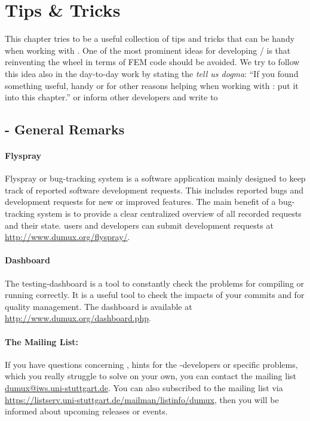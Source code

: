 \section{Tips \& Tricks}

This chapter tries to be a useful collection of tips and tricks that can be handy
when working with \Dumux. One of the most prominent ideas for developing
\Dune / \Dumux is that reinventing the wheel in terms of FEM code should
be avoided. We try to follow this idea also in the day-to-day work by
stating the \emph{tell us dogma}: ``If you found something useful, 
handy or for other reasons helping when working with \Dumux: put it into
this chapter.'' or inform other developers and write to 

\subsection{\Dumux - General Remarks}

\paragraph{Flyspray}
Flyspray or bug-tracking system is a software application mainly designed to
keep track of reported software development requests. This includes reported
bugs and development requests for new or improved features. The main benefit
of a bug-tracking system is to provide a clear centralized overview of all
recorded requests and their state. \Dumux users and developers can submit
development requests at \url{http://www.dumux.org/flyspray/}.

\paragraph{Dashboard}
The testing-dashboard is a tool to constantly check the \Dumux problems for compiling
or running correctly. It is a useful tool to check the impacts of your commits
and for quality management. The dashboard is available at 
\url{http://www.dumux.org/dashboard.php}.

\paragraph{The \Dumux Mailing List:}
If you have questions concerning \Dumux, hints for the \Dumux-developers
or specific problems, which you really struggle to solve on your own,
you can contact the mailing list \url{dumux@iws.uni-stuttgart.de}.
You can also subscribed to the mailing list via
\url{https://listserv.uni-stuttgart.de/mailman/listinfo/dumux}, then you
will be informed about upcoming releases or events.

